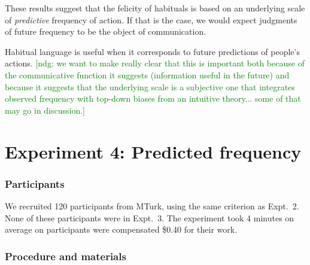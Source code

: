 \documentclass[10pt,letterpaper]{article}
\newcommand{\ndg}[1]{\textcolor{Green}{[ndg: #1]}}
\begin{document}
%
%
%
%

These results suggest that the felicity of habituals is based on an underlying scale of \emph{predictive} frequency of action.
If that is the case, we would expect judgments of future frequency to be the object of communication. 

Habitual language is useful when it corresponds to future predictions of people's actions.
\ndg{we want to make really clear that this is important both because of the communicative function it suggests (information useful in the future) and because it suggests that the underlying scale is a subjective one that integrates observed frequency with top-down biases from an intuitive theory... some of that may go in discussion.}

\section{Experiment 4: Predicted frequency}
\subsubsection{Participants} 

We recruited 120 participants from MTurk, using the same criterion as Expt.~2.
None of these participants were in Expt.~3.
The experiment took 4 minutes on average on participants were compensated \$0.40 for their work.

\subsubsection{Procedure and materials}
\end{document}
